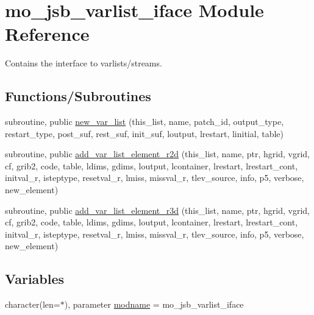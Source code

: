 \hypertarget{namespacemo__jsb__varlist__iface}{}\section{mo\+\_\+jsb\+\_\+varlist\+\_\+iface Module Reference}
\label{namespacemo__jsb__varlist__iface}


Contains the interface to varlists/streams.  


\subsection*{Functions/\+Subroutines}
\begin{DoxyCompactItemize}
\item 
subroutine, public \hyperlink{namespacemo__jsb__varlist__iface_a169b8d752d071050ff305239fe73dbfc}{new\+\_\+var\+\_\+list} (this\+\_\+list, name, patch\+\_\+id, output\+\_\+type, restart\+\_\+type, post\+\_\+suf, rest\+\_\+suf, init\+\_\+suf, loutput, lrestart, linitial, table)
\item 
subroutine, public \hyperlink{namespacemo__jsb__varlist__iface_a1a7673f9db168055de30bc6f735a7ecb}{add\+\_\+var\+\_\+list\+\_\+element\+\_\+r2d} (this\+\_\+list, name, ptr, hgrid, vgrid, cf, grib2, code, table, ldims, gdims, loutput, lcontainer, lrestart, lrestart\+\_\+cont, initval\+\_\+r, isteptype, resetval\+\_\+r, lmiss, missval\+\_\+r, tlev\+\_\+source, info, p5, verbose, new\+\_\+element)
\item 
subroutine, public \hyperlink{namespacemo__jsb__varlist__iface_a0bb929b116f163f5cbe5e680073ca3b2}{add\+\_\+var\+\_\+list\+\_\+element\+\_\+r3d} (this\+\_\+list, name, ptr, hgrid, vgrid, cf, grib2, code, table, ldims, gdims, loutput, lcontainer, lrestart, lrestart\+\_\+cont, initval\+\_\+r, isteptype, resetval\+\_\+r, lmiss, missval\+\_\+r, tlev\+\_\+source, info, p5, verbose, new\+\_\+element)
\end{DoxyCompactItemize}
\subsection*{Variables}
\begin{DoxyCompactItemize}
\item 
character(len=$\ast$), parameter \hyperlink{namespacemo__jsb__varlist__iface_a5a17e1c8f252488a0b648044116fcac7}{modname} = \textquotesingle{}mo\+\_\+jsb\+\_\+varlist\+\_\+iface\textquotesingle{}
\end{DoxyCompactItemize}


